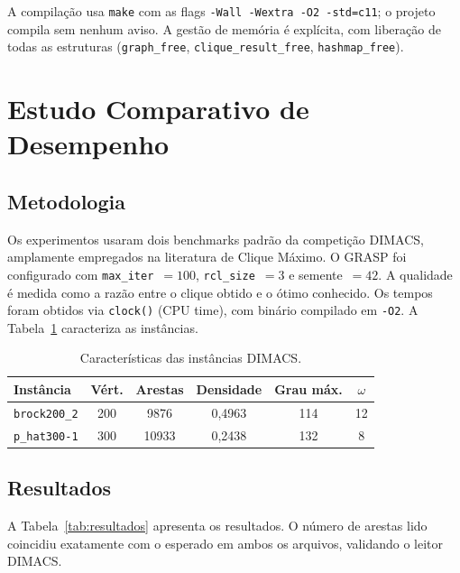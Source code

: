 \documentclass[12pt]{article}
\begin{document}
A compilação usa \texttt{make} com as flags
\texttt{-Wall -Wextra -O2 -std=c11}; o projeto compila sem nenhum aviso. A
gestão de memória é explícita, com liberação de todas as estruturas
(\texttt{graph\_free}, \texttt{clique\_result\_free}, \texttt{hashmap\_free}).

\section{Estudo Comparativo de Desempenho}
\label{sec:experimentos}

\subsection{Metodologia}

Os experimentos usaram dois benchmarks padrão da competição DIMACS, amplamente
empregados na literatura de Clique Máximo. O GRASP foi configurado com
\texttt{max\_iter}~$=100$, \texttt{rcl\_size}~$=3$ e semente~$=42$. A qualidade
é medida como a razão entre o clique obtido e o ótimo conhecido. Os tempos foram
obtidos via \texttt{clock()} (CPU time), com binário compilado em \texttt{-O2}.
A Tabela~\ref{tab:grafos} caracteriza as instâncias.

\begin{table}[ht]
\centering
\caption{Características das instâncias DIMACS.}
\label{tab:grafos}
\begin{tabular}{l c c c c c}
\hline
\textbf{Instância} & \textbf{Vért.} & \textbf{Arestas} & \textbf{Densidade}
 & \textbf{Grau máx.} & \textbf{$\omega$} \\
\hline
\texttt{brock200\_2}  & 200 & 9876  & 0{,}4963 & 114 & 12 \\
\texttt{p\_hat300-1}  & 300 & 10933 & 0{,}2438 & 132 & 8  \\
\hline
\end{tabular}
\end{table}

\subsection{Resultados}

A Tabela~\ref{tab:resultados} apresenta os resultados. O número de arestas lido
coincidiu exatamente com o esperado em ambos os arquivos, validando o leitor
DIMACS.
\end{document}
